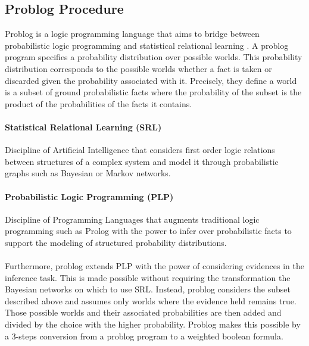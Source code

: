 \subsection{Problog Procedure} 
\label{sec:problog}
Problog is a logic programming language that aims to bridge between probabilistic 
logic programming and statistical relational learning \cite{fierens_van}. 
A problog program specifies a probability distribution over possible worlds. 
This probability distribution corresponds to the possible worlds whether a fact is taken 
or discarded given the probability associated with it. Precisely, they define a world 
is a subset of ground probabilistic facts where the probability of the subset is the product of 
the probabilities of the facts it contains.

\paragraph{Statistical Relational Learning (SRL)}
    Discipline of Artificial Intelligence that considers first order logic relations between 
    structures of a complex system and model it through probabilistic graphs such as Bayesian or 
    Markov networks.

\paragraph{Probabilistic Logic Programming (PLP)}
    Discipline of Programming Languages that augments traditional logic programming such as Prolog 
    with the power to infer over probabilistic facts to support the modeling of structured 
    probability distributions.


\paragraph{}
Furthermore, problog extends PLP with the power of considering evidences 
in the inference task. This is made possible without requiring the transformation 
the Bayesian networks on which to use SRL. Instead, problog considers the subset described above 
and assumes only worlds where the evidence held remains true. Those possible worlds and their associated 
probabilities are then added and divided by the choice with the higher probability. Problog makes this 
possible by a 3-steps conversion from a problog program to a weighted boolean formula.

